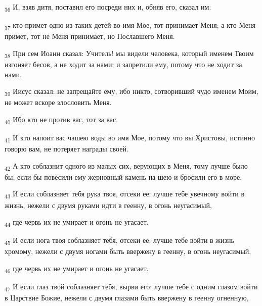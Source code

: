 \begin{tcolorbox}
\textsubscript{36} И, взяв дитя, поставил его посреди них и, обняв его, сказал им:
\end{tcolorbox}
\begin{tcolorbox}
\textsubscript{37} кто примет одно из таких детей во имя Мое, тот принимает Меня; а кто Меня примет, тот не Меня принимает, но Пославшего Меня.
\end{tcolorbox}
\begin{tcolorbox}
\textsubscript{38} При сем Иоанн сказал: Учитель! мы видели человека, который именем Твоим изгоняет бесов, а не ходит за нами; и запретили ему, потому что не ходит за нами.
\end{tcolorbox}
\begin{tcolorbox}
\textsubscript{39} Иисус сказал: не запрещайте ему, ибо никто, сотворивший чудо именем Моим, не может вскоре злословить Меня.
\end{tcolorbox}
\begin{tcolorbox}
\textsubscript{40} Ибо кто не против вас, тот за вас.
\end{tcolorbox}
\begin{tcolorbox}
\textsubscript{41} И кто напоит вас чашею воды во имя Мое, потому что вы Христовы, истинно говорю вам, не потеряет награды своей.
\end{tcolorbox}
\begin{tcolorbox}
\textsubscript{42} А кто соблазнит одного из малых сих, верующих в Меня, тому лучше было бы, если бы повесили ему жерновный камень на шею и бросили его в море.
\end{tcolorbox}
\begin{tcolorbox}
\textsubscript{43} И если соблазняет тебя рука твоя, отсеки ее: лучше тебе увечному войти в жизнь, нежели с двумя руками идти в геенну, в огонь неугасимый,
\end{tcolorbox}
\begin{tcolorbox}
\textsubscript{44} где червь их не умирает и огонь не угасает.
\end{tcolorbox}
\begin{tcolorbox}
\textsubscript{45} И если нога твоя соблазняет тебя, отсеки ее: лучше тебе войти в жизнь хромому, нежели с двумя ногами быть ввержену в геенну, в огонь неугасимый,
\end{tcolorbox}
\begin{tcolorbox}
\textsubscript{46} где червь их не умирает и огонь не угасает.
\end{tcolorbox}
\begin{tcolorbox}
\textsubscript{47} И если глаз твой соблазняет тебя, вырви его: лучше тебе с одним глазом войти в Царствие Божие, нежели с двумя глазами быть ввержену в геенну огненную,
\end{tcolorbox}
